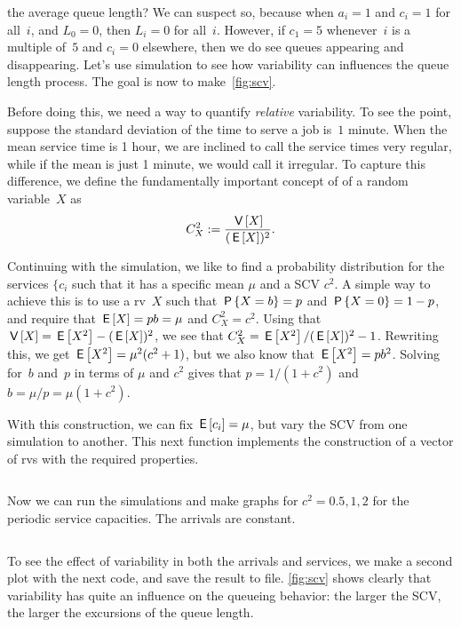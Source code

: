 \documentclass[queueing-book.tex]{subfiles}
\begin{document}
 the average queue length?
We can suspect so, because when $a_{i}=1$ and $c_{i}=1$ for all~$i$, and $L_{0} = 0$,  then $L_{i} = 0$ for all~$i$.
However, if $c_{1}=5$ whenever~$i$ is a multiple of~$5$ and $c_{i}=0$ elsewhere, then we do see queues appearing and disappearing.
Let's use simulation to see how variability can influences the queue length process. The goal is now  to make~\cref{fig:scv}.

Before doing this, we need a way to quantify \emph{relative }variability.
To see the point, suppose the standard deviation of the time to serve a job is~$1$ minute.
When the mean service time is 1 hour, we are inclined to call the service times very regular, while if the mean is just 1 minute, we would call it irregular.
To capture this difference, we define the fundamentally important concept of  of a random variable~$X$  as
\begin{equation*}
 C^2_{X}:= \frac{\V X}{(\E X)^2}.
\end{equation*}


Continuing with the simulation, we like to find a probability distribution for the services $\{c_{i}$ such that it has a specific mean $\mu$ and a SCV $c^{2}$.
A simple  way to achieve this is to use a rv~$X$ such that $\P{X=b} = p$ and $\P{X=0} = 1-p$, and require that $\E X = p b= \mu$ and $C^2_X = c^{2}$.
Using that $\V X = \E{X^{2}} - (\E X)^{2}$, we see that $C^{2}_{X} = \E{X^{2}}/(\E X)^{2} - 1$.
Rewriting this, we get $\E{X^{2}} = \mu^{2}(c^2+1)$, but we also know that $\E{X^{2}} = p b^{2}$.
Solving for~$b$ and~$p$ in terms of $\mu$ and $c^{2}$ gives that $p = 1 / (1 + c^{2})$ and $b=\mu/p = \mu (1+c^{2})$.


With this construction, we can fix $\E{c_{i}}=\mu$, but vary the SCV from one simulation to another.
This next function implements the construction of a vector of rvs with the required properties.
\inputminted[firstline=92, lastline=98]{python}{../code/discrete_simulations.py} %

Now we can run the simulations and make graphs for $c^2=0.5, 1, 2$ for the periodic service capacities. The arrivals are constant.
\inputminted[firstline=105, lastline=117]{python}{../code/discrete_simulations.py} %

To see the effect of variability in both the arrivals and services, we make a second plot with the next code, and save the result to file.
\cref{fig:scv} shows clearly that variability has quite an influence on the queueing behavior: the larger the SCV, the larger the excursions of the queue length.
\inputminted[firstline=121, lastline=130]{python}{../code/discrete_simulations.py} %
\end{document}
